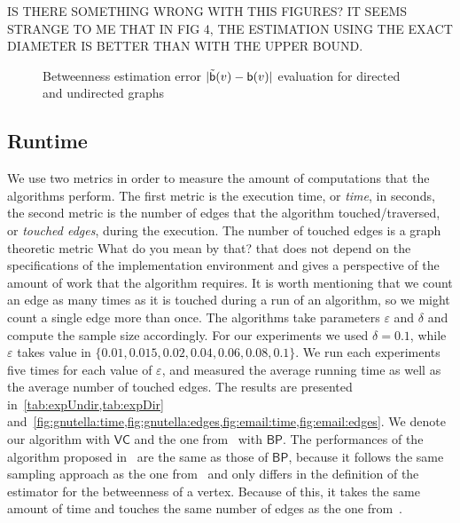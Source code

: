 \XXX IS THERE SOMETHING WRONG WITH THIS FIGURES? IT SEEMS STRANGE TO ME THAT IN
FIG 4, THE ESTIMATION USING THE EXACT DIAMETER IS BETTER THAN WITH THE UPPER
BOUND.

\begin{figure*}[ht]
  \centering
  \hfill
  \hfill
  \hfill
  \caption{Betweenness estimation error $|\tilde{\mathsf{b}}(v)-\mathsf{b}(v)|$ evaluation
  for directed and undirected graphs} 
  \label{fig:error}
\end{figure*}

\subsection{Runtime}\label{sec:runtime}
We use two metrics in order to measure the amount of computations that the
algorithms perform. The first metric is the execution time, or \textit{time}, in
seconds, the second metric is the number of edges that the algorithm
touched/traversed, or \textit{touched edges}, during the execution. The number
of touched edges is a graph theoretic metric \XXX What do you mean by that? that
does not depend on the specifications of the implementation environment and
gives a perspective of the amount of work that the algorithm requires. It is
worth mentioning that we count an edge as many times as it is touched during
a run of an algorithm, so we might count a single edge more than once. The
algorithms take parameters $\varepsilon$ and $\delta$ and compute the sample
size accordingly. For our experiments we used $\delta=0.1$, while $\varepsilon$
takes value in $\{0.01, 0.015, 0.02, 0.04, 0.06, 0.08, 0.1\}$. We run each
experiments five times for each value of $\varepsilon$, and measured the average
running time as well as the average number of touched edges. 
The results are presented in~\cref{tab:expUndir,tab:expDir}
and~\cref{fig:gnutella:time,fig:gnutella:edges,fig:email:time,fig:email:edges}.
We denote our algorithm with $\mathsf{VC}$ and the one from~\citep{BrandesP07}
with $\mathsf{BP}$. The performances of the algorithm proposed
in~\citep{GeisbergerSS08} are the same as those of $\mathsf{BP}$, because it
follows the same sampling approach as the one
from~\citep{BrandesP07,JacobKLPT05} and only differs in the definition of the
estimator for the betweenness of a vertex. Because of this, it takes the same
amount of time and touches the same number of edges as the one
from~\citep{BrandesP07}.

